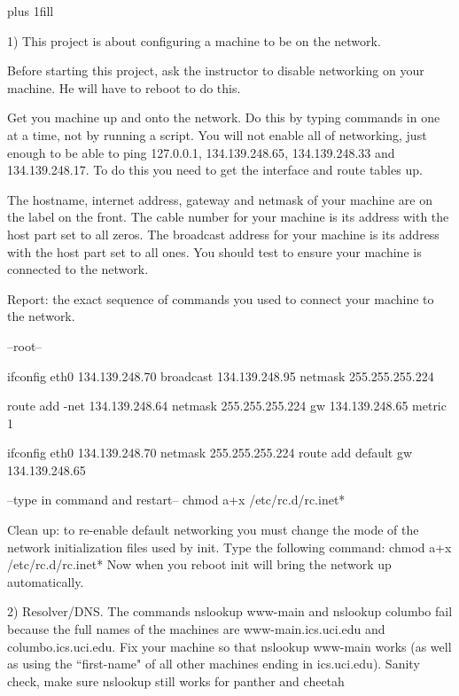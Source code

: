 
\rightskip=0pt plus 1fill

\parindent 0pt
1) This project is about configuring a machine to be on the network.

Before starting this project, ask the instructor to disable networking
on your machine. He will have to reboot to do this.

Get you machine up and onto the network.
Do this by typing commands in one at a time, not by running a script.
You will not enable all of networking, just enough to be
able to ping {\ltt{}127.0.0.1}, {\ltt{}134.139.248.65},
{\ltt{}134.139.248.33} and {\ltt{}134.139.248.17}.
To do this you need to get the interface and route tables up.

The hostname, internet address, gateway and netmask of your machine are
on the label on the front.
The cable number for your machine is its address with the host
part set to all zeros.
The broadcast address for your machine is its address with the host
part set to all ones.
You should test to ensure your machine is connected to the network.

Report: the exact sequence of commands you used to connect your machine
to the network.

--root--

ifconfig eth0 134.139.248.70 broadcast 134.139.248.95 netmask 255.255.255.224

route add -net 134.139.248.64 netmask 255.255.255.224 gw 134.139.248.65 metric
1

ifconfig eth0 134.139.248.70 netmask 255.255.255.224
route add default gw 134.139.248.65

--type in command and restart--
chmod a+x /etc/rc.d/rc.inet*


Clean up: to re-enable default networking you must change the mode
of the network initialization files used by {\ltt{}init}.
Type the following command:
\hfill\break
{\ltt{}chmod a+x /etc/rc.d/rc.inet*}
\hfill\break
Now when you reboot {\ltt{}init} will bring the network up automatically.

2) Resolver/DNS. The commands {\ltt{}nslookup www-main} and 
{\ltt{}nslookup columbo} fail because the full
names of the machines are {\ltt{}www-main.ics.uci.edu} and 
{\ltt{}columbo.ics.uci.edu}.
Fix your machine so that {\ltt{}nslookup www-main} works (as well as using
the ``first-name" of all other machines ending in {\ltt{}ics.uci.edu}).
Sanity check, make sure {\ltt{}nslookup} still works for {\ltt{}panther}
and {\ltt{}cheetah}


